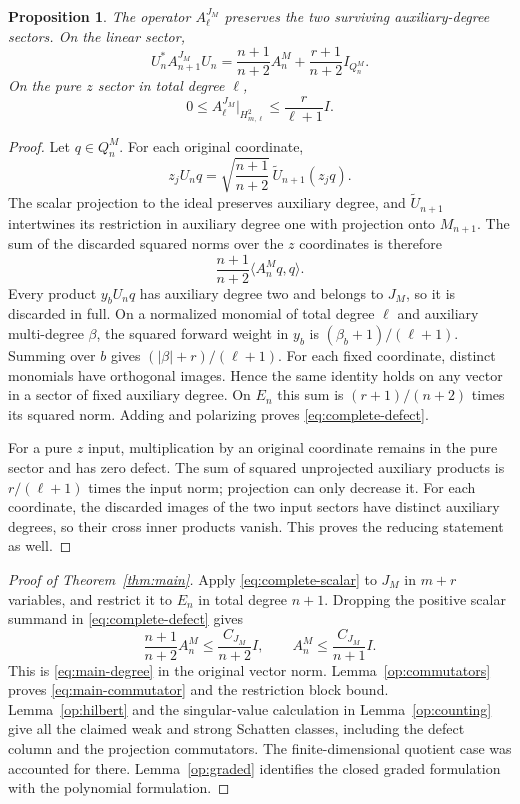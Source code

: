 \documentclass[11pt,reqno]{amsart}
\numberwithin{equation}{section}
\newtheorem{proposition}[theorem]{Proposition}
\theoremstyle{definition}
\theoremstyle{remark}
\begin{document}
\begin{proposition}\label{complete:defect}
The operator $A^{J_M}_\ell$ preserves the two surviving auxiliary-degree
sectors.  On the linear sector,
\begin{equation}\label{eq:complete-defect}
 U_n^*A^{J_M}_{n+1}U_n
 =\frac{n+1}{n+2}A_n^M+\frac{r+1}{n+2}I_{Q_n^M}.
\end{equation}
On the pure $z$ sector in total degree $\ell$,
\[
 0\le A^{J_M}_\ell|_{H_{m,\ell}^2}
       \le\frac r{\ell+1}I.
\]
\end{proposition}
\begin{proof}
Let $q\in Q_n^M$.  For each original coordinate,
\[
 z_jU_nq
 =\sqrt{\frac{n+1}{n+2}}\,\widetilde U_{n+1}(z_jq).
\]
The scalar projection to the ideal preserves auxiliary degree, and
$\widetilde U_{n+1}$ intertwines its restriction in auxiliary degree
one with projection onto $M_{n+1}$.  The sum of the discarded squared
norms over the $z$ coordinates is therefore
\[
 \frac{n+1}{n+2}\langle A_n^Mq,q\rangle.
\]
Every product $y_bU_nq$ has auxiliary degree two and belongs to $J_M$,
so it is discarded in full.  On a normalized monomial of total degree
$\ell$ and auxiliary multi-degree $\beta$, the squared forward weight
in $y_b$ is $(\beta_b+1)/(\ell+1)$.  Summing over $b$ gives
$(|\beta|+r)/(\ell+1)$.  For each fixed coordinate, distinct monomials
have orthogonal images.  Hence the same identity holds on any vector
in a sector of fixed auxiliary degree.  On $E_n$ this sum is
$(r+1)/(n+2)$ times its squared norm.  Adding and polarizing proves
\eqref{eq:complete-defect}.

For a pure $z$ input, multiplication by an original coordinate remains
in the pure sector and has zero defect.  The sum of squared unprojected
auxiliary products is $r/(\ell+1)$ times the input norm; projection can
only decrease it.  For each coordinate, the discarded images of the
two input sectors have distinct auxiliary degrees, so their cross
inner products vanish.  This proves the reducing statement as well.
\end{proof}

\begin{proof}[Proof of Theorem~\ref{thm:main}]
Apply \eqref{eq:complete-scalar} to $J_M$ in $m+r$ variables, and
restrict it to $E_n$ in total degree $n+1$.  Dropping the positive
scalar summand in \eqref{eq:complete-defect} gives
\[
 \frac{n+1}{n+2}A_n^M\le\frac{C_{J_M}}{n+2}I,
 \qquad
 A_n^M\le\frac{C_{J_M}}{n+1}I.
\]
This is \eqref{eq:main-degree} in the original vector norm.
Lemma~\ref{op:commutators} proves
\eqref{eq:main-commutator} and the restriction block bound.
Lemma~\ref{op:hilbert} and the singular-value calculation in
Lemma~\ref{op:counting} give all the claimed weak and strong Schatten
classes, including the defect column and the projection commutators.
The finite-dimensional quotient case was accounted for there.
Lemma~\ref{op:graded} identifies the closed graded formulation with
the polynomial formulation.
\end{proof}
\end{document}
